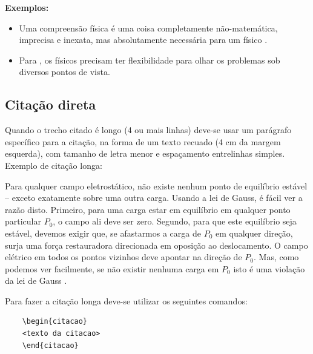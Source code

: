 \textbf{Exemplos:}
\begin{itemize}
    \item  Uma compreensão física é uma coisa completamente não-matemática, imprecisa e inexata, mas absolutamente necessária para um físico \cite{feynman}.
    \item Para , os físicos precisam ter flexibilidade para olhar os problemas sob diversos pontos de vista.
\end{itemize}

\subsection{Citação direta}
\label{subsec:citacaoDireta}

Quando o trecho citado é longo (4 ou mais linhas) deve-se usar um parágrafo específico para a citação, na forma de um texto recuado (4 cm da margem esquerda), com tamanho de letra menor e espaçamento entrelinhas simples. Exemplo de citação longa:
\\
\begin{citacao}
    Para qualquer campo eletrostático, não existe nenhum ponto de equilíbrio estável – exceto exatamente sobre uma outra carga. Usando a lei de Gauss, é fácil ver a razão disto. Primeiro, para uma carga estar em equilíbrio em qualquer ponto particular $P_0$, o campo ali deve ser zero. Segundo, para que este equilíbrio seja estável, devemos exigir que, se afastarmos a carga de $P_0$ em qualquer direção, surja uma força restauradora direcionada em oposição ao deslocamento. O campo elétrico em todos os pontos vizinhos deve apontar na direção de $P_0$. Mas, como podemos ver facilmente, se não existir nenhuma carga em $P_0$ isto é uma violação da lei de Gauss \cite[p.~51]{feynman}.

\end{citacao}
\noindent
Para fazer a citação longa deve-se utilizar os seguintes comandos:
\begin{verbatim}
    \begin{citacao}
    <texto da citacao>
    \end{citacao}
\end{verbatim}

